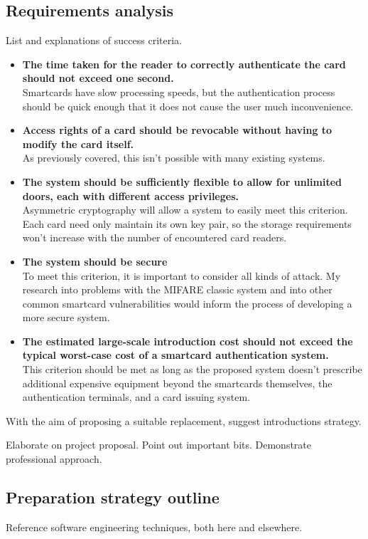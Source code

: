 \documentclass[12pt]{article}
\begin{document}
\subsection{Requirements analysis}
List and explanations of success criteria.
\begin{itemize}
	\item \textbf{The time taken for the reader to correctly authenticate the card should not exceed one second.}\\
	Smartcards have slow processing speeds, but the authentication process should be quick enough that it does not cause the user much inconvenience.
	
	\item \textbf{Access rights of a card should be revocable without having to modify the card itself.}\\
	As previously covered, this isn't possible with many existing systems.
	
	\item \textbf{The system should be sufficiently flexible to allow for unlimited doors, each with different access privileges.}\\
	Asymmetric cryptography will allow a system to easily meet this criterion. Each card need only maintain its own key pair, so the storage requirements won't increase with the number of encountered card readers.
	
	\item \textbf{The system should be secure}\\
	To meet this criterion, it is important to consider all kinds of attack. My research into problems with the MIFARE classic system and into other common smartcard vulnerabilities would inform the process of developing a more secure system.
	
	\item \textbf{The estimated large-scale introduction cost should not exceed the typical worst-case cost of a smartcard authentication system.}\\
	This criterion should be met as long as the proposed system doesn't prescribe additional expensive equipment beyond the smartcards themselves, the authentication terminals, and a card issuing system.
	
	
\end{itemize}
With the aim of proposing a suitable replacement, suggest introductions strategy.


Elaborate on project proposal. Point out important bits. Demonstrate professional approach.
\subsection{Preparation strategy outline}
Reference software engineering techniques, both here and elsewhere.
\end{document}

